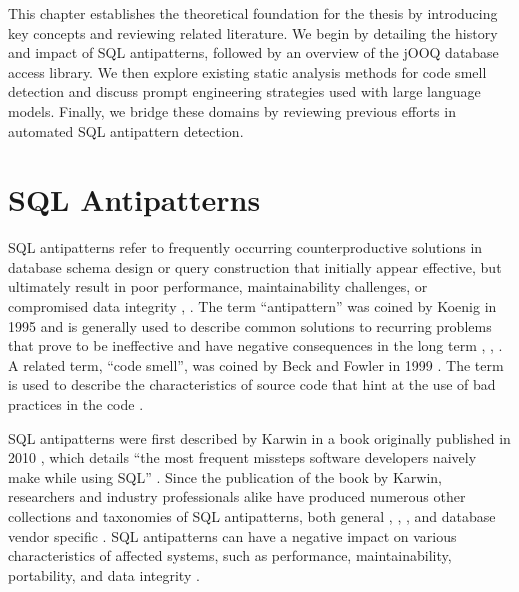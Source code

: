 This chapter establishes the theoretical foundation for the thesis by introducing key concepts and reviewing related literature. We begin by detailing the history and impact of SQL antipatterns, followed by an overview of the jOOQ database access library. We then explore existing static analysis methods for code smell detection and discuss prompt engineering strategies used with large language models. Finally, we bridge these domains by reviewing previous efforts in automated SQL antipattern detection.

\section{SQL Antipatterns}\label{sec:sqlAntipatterns}

SQL antipatterns refer to frequently occurring counterproductive solutions in database schema design or query construction that initially appear effective, but ultimately result in poor performance, maintainability challenges, or compromised data integrity , . The term “antipattern” was coined by Koenig in 1995  and is generally used to describe common solutions to recurring problems that prove to be ineffective and have negative consequences in the long term , , . A related term, “code smell”, was coined by Beck and Fowler in 1999 . The term is used to describe the characteristics of source code that hint at the use of bad practices in the code .

SQL antipatterns were first described by Karwin in a book originally published in 2010 , which details “the most frequent missteps software developers naively make while using SQL” . Since the publication of the book by Karwin, researchers and industry professionals alike have produced numerous other collections and taxonomies of SQL antipatterns, both general , , ,  and database vendor specific . SQL antipatterns can have a negative impact on various characteristics of affected systems, such as performance, maintainability, portability, and data integrity .

